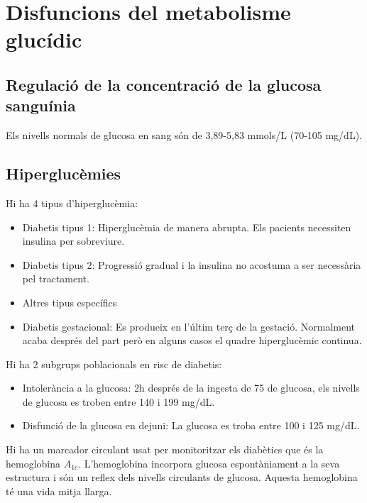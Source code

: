 \section{Disfuncions del metabolisme glucídic}
\label{sec:disf-del-metab}

\subsection{Regulació de la concentració de la glucosa sanguínia}
\label{sec:regulacio-de-la}

Els nivells normals de glucosa en sang són de 3,89-5,83 mmols/L
(70-105 mg/dL).

\subsection{Hiperglucèmies}
\label{sec:hiperglucemies}
Hi ha 4 tipus d'hiperglucèmia:
\begin{itemize}
\item Diabetis tipus 1: Hiperglucèmia de manera abrupta. Els pacients
  necessiten insulina per sobreviure.
\item Diabetis tipus 2: Progressió gradual i la insulina no acostuma a
  ser necessària pel tractament.
\item Altres tipus específics
\item Diabetis gestacional: Es produeix en l'últim terç de la
  gestació. Normalment acaba després del part però en alguns casos el
  quadre hiperglucèmic continua.
\end{itemize}

Hi ha 2 subgrups poblacionals en risc de diabetis:
\begin{itemize}
\item Intolerància a la glucosa: 2h després de la ingesta de 75 de
  glucosa, els nivells de glucosa es troben entre 140 i 199 mg/dL.

\item Disfunció de la glucosa en dejuni: La glucosa es troba entre 100
  i 125 mg/dL.
\end{itemize}

Hi ha un marcador circulant usat per monitoritzar els diabètics que és
la hemoglobina $A_{1c}$. L'hemoglobina incorpora glucosa
espontàniament a la seva estructura i són un reflex dels nivells
circulants de glucosa. Aquesta hemoglobina té una vida mitja llarga.

